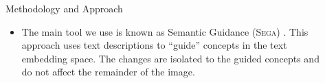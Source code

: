 \documentclass[final]{beamer}
\newlength{\sepwid}
\newlength{\onecolwid}
\newlength{\twocolwid}
\begin{document}
\begin{frame}[t]
\begin{columns}[t]
\begin{column}{\twocolwid}
\begin{columns}[t,totalwidth=\twocolwid]

\end{columns} %

\end{column} %

   
\begin{column}{\sepwid}\end{column} %

\begin{column}{\onecolwid} %

\begin{block}{Methodology and Approach}
\begin{itemize}
\item The main tool we use is known as Semantic Guidance (\textsc{Sega}) \cite{brack2023sega}. This approach uses text descriptions to ``guide'' concepts in the text embedding space. The changes are isolated to the guided concepts and do not affect the remainder of the image.

\end{itemize}
    \begin{center}
\begin{figure}


\end{figure}
\end{center}
\end{block}
\end{column}
\end{columns}
\end{frame}
\end{document}
